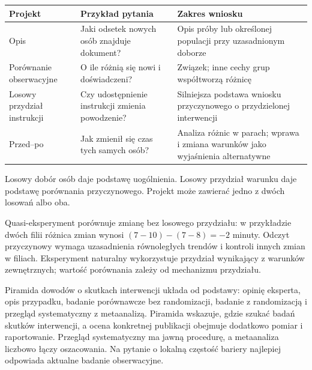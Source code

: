 \documentclass[
  polish,
  11pt,
  a4paper,
]{article}
\newcounter{none} %
\begin{document}
{\def\LTcaptype{none} %
\begin{longtable}[]{@{}
  >{\raggedright\arraybackslash}p{}
  >{\raggedright\arraybackslash}p{}
  >{\raggedright\arraybackslash}p{}@{}}
\toprule\noalign{}
\begin{minipage}[b]{\linewidth}\raggedright
Projekt
\end{minipage} & \begin{minipage}[b]{\linewidth}\raggedright
Przykład pytania
\end{minipage} & \begin{minipage}[b]{\linewidth}\raggedright
Zakres wniosku
\end{minipage} \\
\midrule\noalign{}
\endhead
\bottomrule\noalign{}
\endlastfoot
Opis & Jaki odsetek nowych osób znajduje dokument? & Opis próby lub
określonej populacji przy uzasadnionym doborze \\
Porównanie obserwacyjne & O ile różnią się nowi i doświadczeni? &
Związek; inne cechy grup współtworzą różnicę \\
Losowy przydział instrukcji & Czy udostępnienie instrukcji zmienia
powodzenie? & Silniejsza podstawa wniosku przyczynowego o przydzielonej
interwencji \\
Przed--po & Jak zmienił się czas tych samych osób? & Analiza różnic w
parach; wprawa i zmiana warunków jako wyjaśnienia alternatywne \\
\end{longtable}
}

Losowy dobór osób daje podstawę uogólnienia. Losowy przydział warunku
daje podstawę porównania przyczynowego. Projekt może zawierać jedno z
dwóch losowań albo oba.

Quasi-eksperyment porównuje zmianę bez losowego przydziału: w
przykładzie dwóch filii różnica zmian wynosi \((7-10)-(7-8)=-2\) minuty.
Odczyt przyczynowy wymaga uzasadnienia równoległych trendów i kontroli
innych zmian w filiach. Eksperyment naturalny wykorzystuje przydział
wynikający z warunków zewnętrznych; wartość porównania zależy od
mechanizmu przydziału.

Piramida dowodów o skutkach interwencji układa od podstawy: opinię
eksperta, opis przypadku, badanie porównawcze bez randomizacji, badanie
z randomizacją i przegląd systematyczny z metaanalizą. Piramida
wskazuje, gdzie szukać badań skutków interwencji, a ocena konkretnej
publikacji obejmuje dodatkowo pomiar i raportowanie. Przegląd
systematyczny ma jawną procedurę, a metaanaliza liczbowo łączy
oszacowania. Na pytanie o lokalną częstość bariery najlepiej odpowiada
aktualne badanie obserwacyjne.
\end{document}

